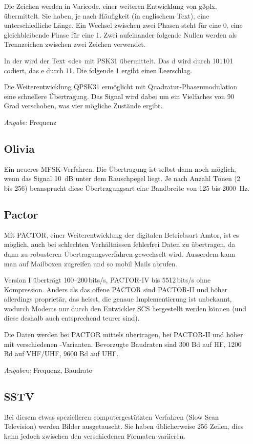 Die Zeichen werden in Varicode, einer weiteren Entwicklung von g3plx, übermittelt. Sie haben, je nach Häufigkeit (in englischem Text), eine unterschiedliche Länge. Ein Wechsel zwischen zwei Phasen steht für eine 0, eine gleichbleibende Phase für eine 1. Zwei aufeinander folgende Nullen werden als Trennzeichen zwischen zwei Zeichen verwendet.

In der  wird der Text «de» mit PSK31 übermittelt. Das d wird durch 101101 codiert, das e durch 11. Die folgende 1 ergibt einen Leerschlag.

Die Weiterentwicklung QPSK31 ermöglicht mit Quadratur-Phasenmodulation eine schnellere Übertragung. Das Signal wird dabei um ein Vielfaches von 90 Grad verschoben, was vier mögliche Zustände ergibt. 

\textit{Angabe:} Frequenz

\subsection{Olivia}
Ein neueres MFSK-Verfahren. Die Übertragung ist selbst dann noch möglich, wenn das Signal 10 dB unter dem Rauschpegel liegt. Je nach Anzahl Tönen (2 bis 256) beansprucht diese Übertragungsart eine Bandbreite von 125 bis 2000 Hz.

\subsection{Pactor}
Mit PACTOR, einer Weiterentwicklung der digitalen Betriebsart Amtor, ist es möglich, auch bei schlechten Verhältnissen fehlerfrei Daten zu übertragen, da dann zu robusteren Übertragungsverfahren gewechselt wird. Ausserdem kann man auf Mailboxen zugreifen und so mobil Mails abrufen.

Version I überträgt 100--200\,bits/s, PACTOR-IV bis 5512\,bits/s ohne Kompression. Anders als das offene PACTOR sind PACTOR-II und höher allerdings proprietär, das heisst, die genaue Implementierung ist unbekannt, wodurch Modems nur durch den Entwickler SCS hergestellt werden können (und diese deshalb auch entsprechend teurer sind).

Die Daten werden bei PACTOR mittels  übertragen, bei PACTOR-II und höher mit verschiedenen -Varianten. Bevorzugte Baudraten sind 300 Bd auf HF, 1200 Bd auf VHF/UHF, 9600 Bd auf UHF.

\textit{Angaben:} Frequenz, Baudrate

\subsection{SSTV}
Bei diesem etwas spezielleren computergestützten Verfahren (Slow Scan Television) werden Bilder ausgetauscht. Sie haben üblicherweise 256 Zeilen, dies kann jedoch zwischen den verschiedenen Formaten variieren.

